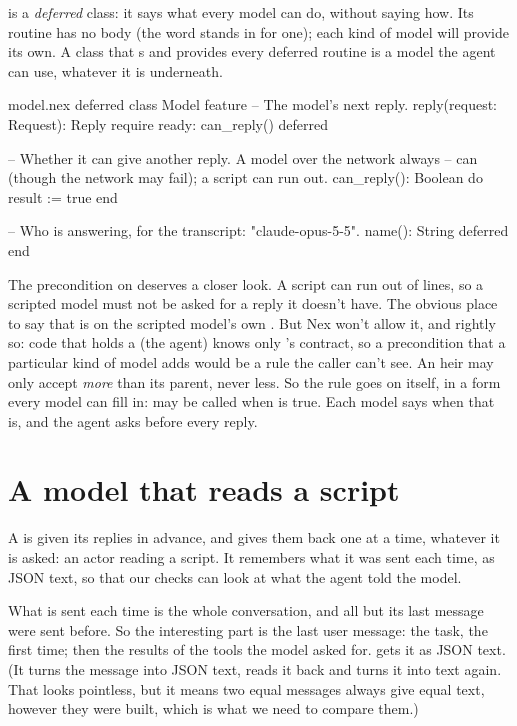  is a \emph{deferred} class: it says what every model can do,
without saying how. Its  routine has no body (the word
 stands in for one); each kind of model will provide its
own. A class that s  and provides every deferred
routine is a model the agent can use, whatever it is underneath.

\begin{append}{model.nex}
deferred class Model
feature
  -- The model's next reply.
  reply(request: Request): Reply
  require
    ready: can_reply()
  deferred

  -- Whether it can give another reply. A model over the network always
  -- can (though the network may fail); a script can run out.
  can_reply(): Boolean do
    result := true
  end

  -- Who is answering, for the transcript: "claude-opus-5-5".
  name(): String deferred
end
\end{append}

The precondition on  deserves a closer look. A script can run
out of lines, so a scripted model must not be asked for a reply it doesn't
have. The obvious place to say that is on the scripted model's own
. But Nex won't allow it, and rightly so: code that holds a
 (the agent) knows only 's contract, so a
precondition that a particular kind of model adds would be a rule the
caller can't see. An heir may only accept \emph{more} than its parent, never
less. So the rule goes on  itself, in a form every model can
fill in:  may be called when  is true. Each
model says when that is, and the agent asks before every reply.

\section{A model that reads a script}

A  is given its replies in advance, and gives them
back one at a time, whatever it is asked: an actor reading a script. It
remembers what it was sent each time, as JSON text, so that our checks can
look at what the agent told the model.

What is sent each time is the whole conversation, and all but its last
message were sent before. So the interesting part is the last user
message: the task, the first time; then the results of the tools the model
asked for.  gets it as JSON text. (It turns the
message into JSON text, reads it back and turns it into text again. That
looks pointless, but it means two equal messages always give equal text,
however they were built, which is what we need to compare them.)

